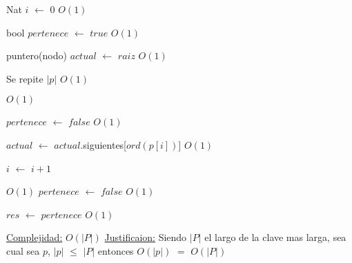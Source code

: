 \begin{Algoritmos}
\begin{algorithm}[H]
\begin{algorithmic}[1]
\State Nat $i$ $\gets$ $0$ \Comment $O(1)$

\State bool $pertenece$ $\gets$ $true$ \Comment $O(1)$

\State puntero(nodo) $actual$ $\gets$ $raiz$ \Comment $O(1)$ 

   \Comment Se repite $|p|$ $O(1)$
		
	
	 \Comment $O(1)$

		\State $pertenece$ $\gets$ $false$ \Comment $O(1)$	 
	
	\EndIf
	
	\State $actual$ $\gets$ $actual$.siguientes[$ord(p[i])$] \Comment $O(1)$

	\State $i$ $\gets$ $i + 1$
\EndWhile 

 \Comment $O(1)$ 
	\State $pertenece$ $\gets$ $false$ \Comment $O(1)$
\EndIf

\State $res$ $\gets$ $pertenece$ \Comment $O(1)$ 

\medskip
\State \underline{Complejidad:} $O(|P|)$
\State \underline{Justificaion:} Siendo $|P|$ el largo de la clave mas larga, sea cual sea $p$, $|p|$ $\leq$ $|P|$ entonces 	$O(|p|)$ $=$ $O(|P|)$

\end{algorithmic}
\end{algorithm}
  

  
\end{Algoritmos}


